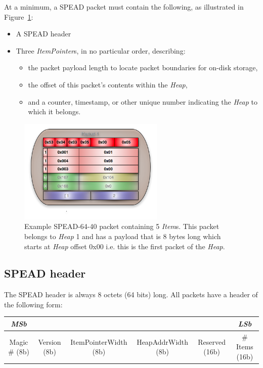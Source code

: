 \documentclass[11pt,english,twoside]{article}
\begin{document}
At a minimum, a SPEAD packet must contain the following, as illustrated in Figure~\ref{fig:packet_construct}:
\begin{itemize}
\item A SPEAD header
\item Three \emph{ItemPointer}s, in no particular order, describing:
  \begin{itemize}
    \item the packet payload length to locate packet boundaries for on-disk storage,
    \item the offset of this packet's contents within the \emph{Heap},
    \item and a counter, timestamp, or other unique number indicating the \emph{Heap} to which it belongs.
  \end{itemize}
\end{itemize}

\begin{figure}[!htb]
\centering
\includegraphics[height=5cm]{images/spead_packet_construct}
\caption[\emph{Heap} packet example]{\label{fig:packet_construct}\small Example SPEAD-64-40 packet containing 5 \emph{Item}s. This packet
belongs to \emph{Heap} 1 and has a payload that is 8 bytes long which starts at \emph{Heap} offset 0x00 i.e. this is the first packet of the
\emph{Heap}.}
\end{figure}


\subsection{SPEAD header}

The SPEAD header is always 8 octets (64 bits) long. All packets have a header of the following form:

\begin{tabular}{|c|c|c|c|c|c|}
\hline
\emph{MSb} &&&&& \emph{LSb} \\
\hline
Magic \# (8b) & Version (8b) & ItemPointerWidth (8b) & HeapAddrWidth (8b) & Reserved (16b) & \# Items (16b)\\
\hline
\end{tabular}
\end{document}
